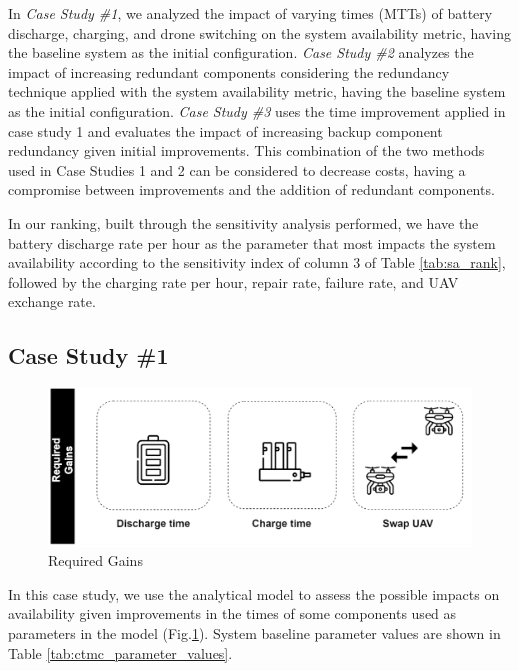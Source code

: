 \documentclass[conference]{IEEEtran}
\begin{document}
In \textit{Case Study \#1}, we analyzed the impact of varying times (MTTs) of battery discharge, charging, and drone switching on the system availability metric, having the baseline system as the initial configuration. 
%
\textit{Case Study \#2} analyzes the impact of increasing redundant components considering the redundancy technique applied with the system availability metric, having the baseline system as the initial configuration. 
%
\textit{Case Study \#3} uses the time improvement applied in case study 1 and evaluates the impact of increasing backup component redundancy given initial improvements. This combination of the two methods used in Case Studies 1 and 2 can be considered to decrease costs, having a compromise between improvements and the addition of redundant components.


In our ranking, built through the sensitivity analysis performed, we have the battery discharge rate per hour as the parameter that most impacts the system availability according to the sensitivity index of column 3 of Table \ref{tab:sa_rank}, followed by the charging rate per hour, repair rate, failure rate, and UAV exchange rate.


\subsection{Case Study \#1}
\label{sec:case_studies_sub01}

\begin{figure}[htbp]
\centerline{\includegraphics[scale=0.2]{img/operating_model_study_01.png}}
\caption{Required Gains}
\label{fig:case_study_01}
\end{figure}

In this case study, we use the analytical model to assess the possible impacts on availability given improvements in the times of some components used as parameters in the model (Fig.\ref{fig:case_study_01}). System baseline parameter values are shown in Table \ref{tab:ctmc_parameter_values}.
\end{document}
